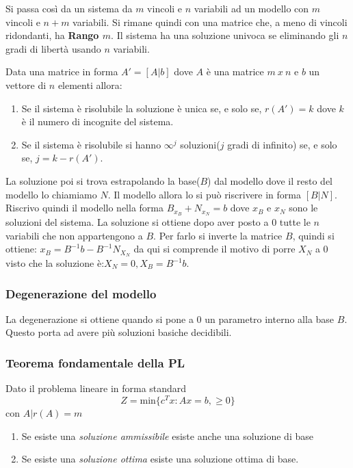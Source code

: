\documentclass{article}
\begin{document}
Si passa così da un sistema da $m$ vincoli e $n$ variabili ad un modello con $m$ vincoli e $n+m$ variabili. Si rimane quindi con una matrice che, a meno di vincoli ridondanti, ha \textbf{Rango $m$}. Il sistema ha una soluzione univoca se eliminando gli $n$ gradi di libertà usando $n$ variabili.

\begin{tcolorbox}[
    colback=lightgray,
    colframe=black,
    coltext=black,
    title=Teorema di Rouché Capelli,
    colbacktitle=black,
    coltitle=lightgray,
    breakable
  ]
  Data una matrice in forma $A'=[A|b]$ dove $A$ è una matrice $m\ x\ n$ e $b$ un vettore di $n$ elementi allora:
  \begin{enumerate}
    \item Se il sistema è risolubile la soluzione è unica se, e solo se, $r(A')=k$ dove $k$ è il numero di incognite del sistema.
    \item Se il sistema è risolubile si hanno $\infty^j$ soluzioni($j$ gradi di infinito) se, e solo se, $j=k-r(A')$.
  \end{enumerate}
\end{tcolorbox}

La soluzione poi si trova estrapolando la base($B$) dal modello dove il resto del modello lo chiamiamo $N$. Il modello allora lo si può riscrivere in forma $[B|N]$. Riscrivo quindi il modello nella forma $B_{x_B}+N_{x_N}=b$ dove $x_B$ e $x_N$ sono le soluzioni del sistema. La soluzione si ottiene dopo aver posto a $0$ tutte le $n$ variabili che non appartengono a $B$. Per farlo si inverte la matrice $B$, quindi si ottiene: $x_B=B^{-1}b-B^{-1}N_{X_N}$ da qui si comprende il motivo di porre $X_N$ a $0$ visto che la soluzione è:$X_N=0, X_B = B^{-1}b$.

\subsubsection{Degenerazione del modello}
La degenerazione si ottiene quando si pone a $0$ un parametro interno alla base $B$. Questo porta ad avere più soluzioni basiche decidibili.

\subsubsection{\textbf{Teorema fondamentale della PL}}
Dato il problema lineare in forma standard
$$Z=\text{min}\{c^Tx:Ax=b, \ge 0 \}$$
con $A|r(A)=m$
\begin{enumerate}
  \item Se esiste una \textit{soluzione ammissibile} esiste anche una soluzione di base
  \item Se esiste una \textit{soluzione ottima} esiste una soluzione ottima di base.
\end{enumerate}
\end{document}

